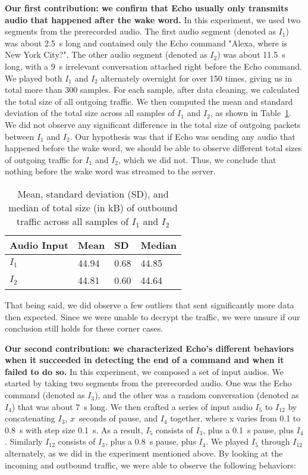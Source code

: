 \textbf{Our first contribution: we confirm that Echo usually only transmits audio that happened after the wake word.} In this experiment, we used two segments from the prerecorded audio. The first audio segment (denoted as $I_1$) was about 2.5~s long and contained only the Echo command "Alexa, where is New York City?". The other audio segment (denoted as $I_2$) was about 11.5~s long, with a 9~s irrelevant conversation attached right before the Echo command. We played both $I_1$ and $I_2$ alternately overnight for over 150 times, giving us in total more than 300 samples. For each sample, after data cleaning, we calculated the total size of all outgoing traffic. We then computed the mean and standard deviation of the total size across all samples of $I_1$ and $I_2$, as shown in Table~\ref{table1}. We did not observe any significant difference in the total size of outgoing packets between $I_1$ and $I_2$. Our hypothesis was that if Echo was sending any audio that happened before the wake word, we should be able to observe different total sizes of outgoing traffic for $I_1$ and $I_2$, which we did not. Thus, we conclude that nothing before the wake word was streamed to the server.

\begin{table}[!b]
\caption{Mean, standard deviation (SD), and median of total size (in kB) of outbound traffic across all samples of $I_1$ and $I_2$}
\begin{tabular}{llll}
\toprule
Audio Input & Mean & SD & Median \\
\midrule
$I_1$ & 44.94 & 0.68 & 44.85\\
$I_2$ & 44.81 & 0.60 & 44.64\\
\bottomrule
\end{tabular}
\label{table1}
\end{table}

That being said, we did observe a few outliers that sent significantly more data then expected. Since we were unable to decrypt the traffic, we were unsure if our conclusion still holds for these corner cases.

\textbf{Our second contribution: we characterized Echo's different behaviors when it succeeded in detecting the end of a command and when it failed to do so.} In this experiment, we composed a set of input audios. We started by taking two segments from the prerecorded audio. One was the Echo command (denoted as $I_3$), and the other was a random conversation (denoted as $I_4$) that was about 7~s long. We then crafted a series of input audio $I_5$ to $I_{12}$ by concatenating $I_3$, $x$~seconds of pause, and $I_4$ together, where x varies from 0.1 to 0.8~s with step size 0.1~s. As a result, $I_5$ consists of $I_3$, plus a 0.1~s pause, plus $I_4$. Similarly $I_{12}$ consists of $I_3$, plus a 0.8~s pause, plus $I_4$. We played $I_5$ through $I_{12}$ alternately, as we did in the experiment mentioned above. By looking at the incoming and outbound traffic, we were able to observe the following behaviors:

